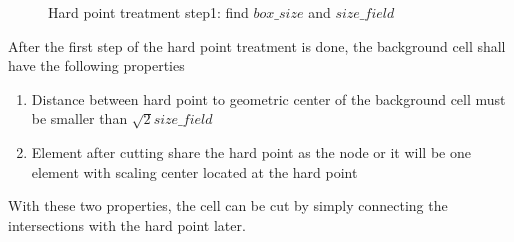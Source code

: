     \begin{figure}
        \centering
        \caption[Hard point treatment step 1]{Hard point treatment step1: find $box\_size$ and $size\_field$}
        \label{qdt_fig:qdt_hard_point_setp_1}
    \end{figure}

After the first step of the hard point treatment is done, the background cell shall have the following properties
    \begin{enumerate}
        \item Distance between hard point to geometric center of the background cell must be smaller than $\sqrt{2}size\_field$
        \item Element after cutting share the hard point as the node or it will be one element with scaling center located at the hard point
    \end{enumerate}
With these two properties, the cell can be cut by simply connecting the intersections with the hard point later.
\pagebreak


